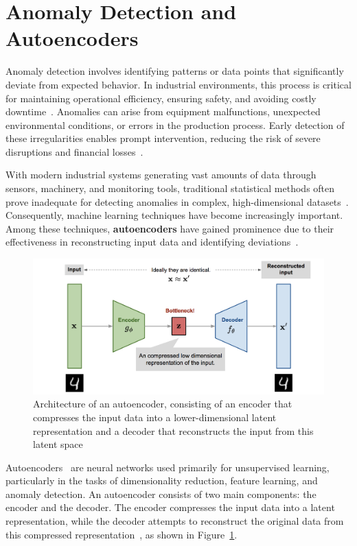 \documentclass[12pt,DIV14,BCOR12mm,a4paper,footinclude=false,headinclude,parskip=half-,twoside,openright,cleardoublepage=empty,toc=index,bibliography=totoc,listof=totoc]{scrreprt}
\numberwithin{equation}{chapter}
\begin{document}
\section{Anomaly Detection and Autoencoders}

Anomaly detection involves identifying patterns or data points that significantly deviate from expected behavior. In industrial environments, this process is critical for maintaining operational efficiency, ensuring safety, and avoiding costly downtime~\cite{marti2015anomaly}. Anomalies can arise from equipment malfunctions, unexpected environmental conditions, or errors in the production process. Early detection of these irregularities enables prompt intervention, reducing the risk of severe disruptions and financial losses~\cite{panza2023anomaly}.

With modern industrial systems generating vast amounts of data through sensors, machinery, and monitoring tools, traditional statistical methods often prove inadequate for detecting anomalies in complex, high-dimensional datasets~\cite{marti2015anomaly}. Consequently, machine learning techniques have become increasingly important. Among these techniques, \textbf{autoencoders} have gained prominence due to their effectiveness in reconstructing input data and identifying deviations~\cite{torabi2023practical}.
\begin{figure}
	\centering
	\includegraphics[scale=.55]{../media/autoencoder-architecture.png}
	\caption{Architecture of an autoencoder, consisting of an encoder that compresses the input data into a lower-dimensional latent representation and a decoder that reconstructs the input from this latent space~\cite{Khandelwal:2021}}
	\label{autoencoder}
\end{figure}

Autoencoders~\cite{michelucci2022introduction} are neural networks used primarily for unsupervised learning, particularly in the tasks of dimensionality reduction, feature learning, and anomaly detection. An autoencoder consists of two main components: the encoder and the decoder. The encoder compresses the input data into a latent representation, while the decoder attempts to reconstruct the original data from this compressed representation~\cite{bank2023autoencoders}, as shown in Figure~\ref{autoencoder}.
\end{document}
